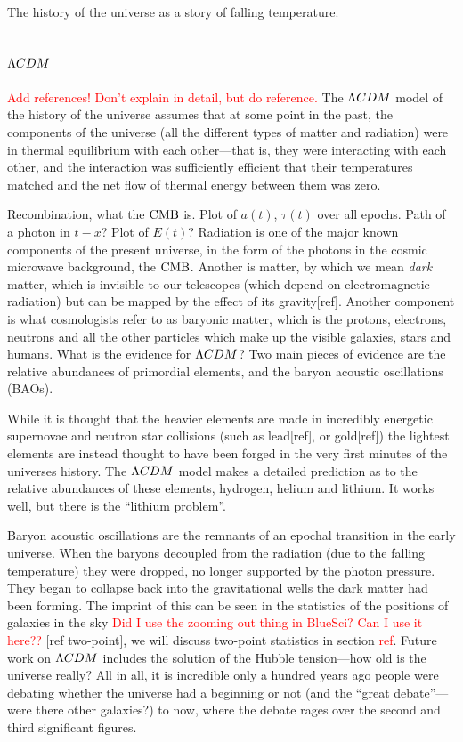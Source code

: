 \newpage
    The history of the universe as a story of falling temperature.
\newpage
    \subsection{$\Lambda CDM$}
    \textcolor{red}{Add references! Don't explain in detail, but do reference.}
    The $\Lambda CDM$ model of the history of the universe assumes that at some point in the
    past, the components of the universe (all the different types of matter and radiation)
    were in thermal equilibrium with each other---that is, they were interacting with each other,
    and the interaction was sufficiently efficient that their temperatures matched
    and the net flow of thermal energy between them was zero.


    Recombination, what the $\text{CMB}$ is.
    Plot of $a(t)$, $\tau(t)$ over all epochs.
    Path of a photon in $t-x$? Plot of $E(t)$?
\newpage
    Radiation is one of the major known components of the present universe, in the form of the
    photons in the cosmic microwave background, the $\text{CMB}$. Another is matter, by which we mean \textit{dark} matter,
    which is invisible to our telescopes (which depend on electromagnetic radiation) but can be mapped by the
    effect of its gravity[ref]. Another component is what cosmologists refer to as baryonic matter, which is
    the protons, electrons, neutrons and all the other particles which make up the visible galaxies, stars
    and humans.
\newpage
    What is the evidence for $\Lambda CDM$? Two main pieces of evidence are the relative abundances of
    primordial elements, and the baryon acoustic oscillations (BAOs).


    While it is thought that the heavier elements are made in incredibly energetic supernovae and
    neutron star collisions (such as lead[ref], or gold[ref]) the lightest elements are instead thought to have been forged in the
    very first minutes of the universes history. The $\Lambda CDM$ model makes a detailed prediction as to the
    relative abundances of these elements, hydrogen, helium and lithium. It works well, but there is
    the ``lithium problem''.


    Baryon acoustic oscillations are the remnants of an epochal transition in the early universe.
    When the baryons decoupled from the radiation (due to the falling temperature) they were dropped,
    no longer supported by the photon pressure. They began to collapse back into the gravitational
    wells the dark matter had been forming. The imprint of this can be seen in the statistics
    of the positions of galaxies in the sky \textcolor{red}{Did I use the zooming out thing in
    BlueSci? Can I use it here??} [ref two-point], we will discuss two-point statistics in
    section \textcolor{red}{ref}.
\newpage
    Future work on $\Lambda CDM$ includes the solution of the Hubble tension---how old is the universe really?
    All in all, it is incredible only a hundred years ago people were debating whether the universe had a beginning or not
    (and the ``great debate''---were there other galaxies?) to now, where the debate rages over the second and third significant
    figures.
\newpage
